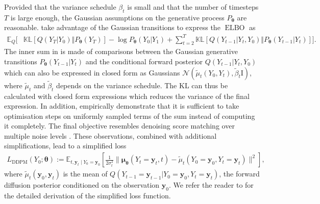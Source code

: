 Provided that the variance schedule $\beta_t$ is small and that the number of timesteps $T$ is large enough, the Gaussian assumptions on the generative process $P_{\bm{\theta}}$ are reasonable. \citet{ho_denoising_2020} take advantage of the Gaussian transitions to express the $\operatorname{ELBO}$ as
\begin{align}
        \mathbb{E}_Q \biggl[& \mathbb{KL}\left[Q(Y_T|Y_0)\Vert P_{\bm{\theta}}(Y_T)\right] - \log P_{\bm{\theta}}(Y_0|Y_1) + \sum_{t=2}^T \mathbb{KL}\left[Q(Y_{t-1}|Y_t, Y_0)\Vert P_{\bm{\theta}}(Y_{t-1}|Y_t)\right]
     \biggr]. \label{eq:simple_DDPM_ELBO}
\end{align}
The inner sum in  is made of comparisons between the Gaussian generative transitions $P_{\bm{\theta}}(Y_{t-1}|Y_t)$ and the conditional forward posterior $Q(Y_{t-1}|Y_t, Y_0)$ which can also be expressed in closed form as Gaussians $\mathcal{N}(\tilde{\mu}_t(Y_0, Y_t), \tilde{\beta}_t \text{I})$, where $\tilde{\mu}_t$ and $\tilde{\beta}_t$ depends on the variance schedule. The KL can thus be calculated with closed form expressions which reduces the variance of the final expression.
In addition, \citet{ho_denoising_2020} empirically demonstrate that it is sufficient to take optimisation steps on uniformly sampled terms of the sum instead of computing it completely. The final objective resembles denoising score matching over multiple noise levels \citep{vincent2011connection}. These observations, combined with additional simplifications, lead to a simplified loss
\begin{align}
    L_\text{DDPM}(Y_0; \bm{\theta}) := \mathbb{E}_{t, \mathbf{y}_t \mid Y_0 = \mathbf{y}_0}\left[ \frac{1}{2\sigma^2_t}\lVert \mathbf{\mu}_{\bm{\theta}}(Y_t=\mathbf{y}_t, t) - \tilde{\mu}_t(Y_0=\mathbf{y}_0, Y_t=\mathbf{y}_t)  \rVert^2\right],
\end{align}
where $\tilde{\mu}_t(\mathbf{y}_0, \mathbf{y}_t)$ is the mean of $Q(Y_{t-1} = \mathbf{y}_{t-1}|Y_0 = \mathbf{y}_{0}, Y_t = \mathbf{y}_{t})$, the forward diffusion posterior conditioned on the observation $\mathbf{y}_{0}$. We refer the reader to \citet{ho_denoising_2020} for the detailed derivation of the simplified loss function.

